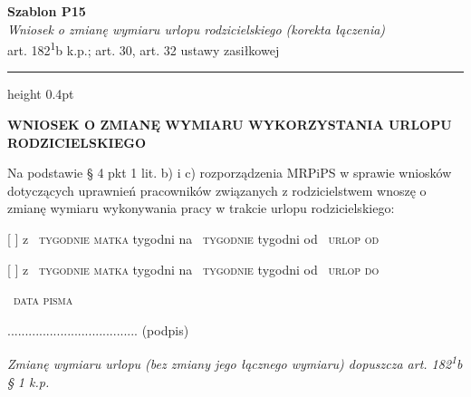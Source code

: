 \documentclass[11pt,a4paper]{article}
\newcommand{\Pole}[1]{%
  \textcolor{szary}{\dotfill}\,%
  {\scriptsize\textcolor{szary}{\textsc{#1}}}%
}
\newcommand{\NaglowekPisma}[1]{%
  \par\vspace{0.8em}%
  \begin{center}%
    {\large\bfseries\MakeUppercase{#1}}%
  \end{center}%
  \vspace{0.4em}%
}
\begin{document}
\begin{flushright}
{\footnotesize\color{szary}
\textbf{Szablon P15}\\
{\itshape Wniosek o zmianę wymiaru urlopu rodzicielskiego (korekta łączenia)}\\
art. 182\textsuperscript{1}b k.p.; art. 30, art. 32 ustawy zasiłkowej}\
\end{flushright}

\vspace{0.5em}
{\color{ramka}\hrule height 0.4pt}
\vspace{0.8em}

\NaglowekPisma{WNIOSEK O ZMIANĘ WYMIARU WYKORZYSTANIA URLOPU RODZICIELSKIEGO}

Na podstawie \S{} 4 pkt 1 lit. b) i c) rozporządzenia MRPiPS w sprawie wniosków
dotyczących uprawnień pracowników związanych z rodzicielstwem wnoszę o zmianę
wymiaru wykonywania pracy w trakcie urlopu rodzicielskiego:

[ ] z \Pole{tygodnie matka} tygodni na \Pole{tygodnie} tygodni od \Pole{urlop od}
[ ] z \Pole{tygodnie matka} tygodni na \Pole{tygodnie} tygodni od \Pole{urlop do}

\Pole{data pisma}
.....................................
(podpis)

\vfill
{\footnotesize\textcolor{szary}\itshape Zmianę wymiaru urlopu (bez zmiany jego łącznego wymiaru) dopuszcza art. 182\textsuperscript{1}b \S{} 1 k.p.}
\end{document}
